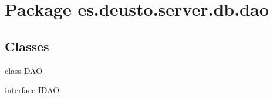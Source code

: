 \hypertarget{namespacees_1_1deusto_1_1server_1_1db_1_1dao}{}\section{Package es.\+deusto.\+server.\+db.\+dao}
\label{namespacees_1_1deusto_1_1server_1_1db_1_1dao}
\subsection*{Classes}
\begin{DoxyCompactItemize}
\item 
class \hyperlink{classes_1_1deusto_1_1server_1_1db_1_1dao_1_1_d_a_o}{D\+AO}
\item 
interface \hyperlink{interfacees_1_1deusto_1_1server_1_1db_1_1dao_1_1_i_d_a_o}{I\+D\+AO}
\end{DoxyCompactItemize}
